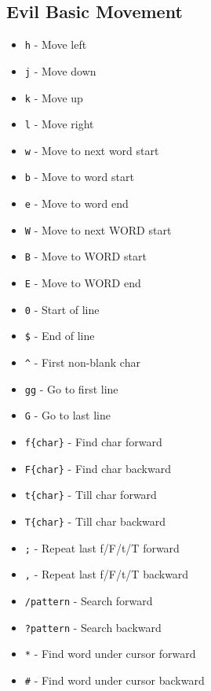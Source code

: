\documentclass[6pt,landscape]{article}
\newcommand{\key}[1]{\texttt{#1}}
\begin{document}
\begin{multicols*}{5}

\section*{Evil Basic Movement}
\begin{itemize}[
    leftmargin=*,
    itemsep=0.1em,
    parsep=0pt,
    topsep=0pt,
    partopsep=0pt,
    align=left,      %
    labelwidth=1em,  %
    labelsep=0.5em,  %
    itemindent=0em,  %
    listparindent=0em, %
    rightmargin=0pt, %
    wide=0pt         %
]
\item \key{h} - Move left
\item \key{j} - Move down
\item \key{k} - Move up
\item \key{l} - Move right
\item \key{w} - Move to next word start
\item \key{b} - Move to word start
\item \key{e} - Move to word end
\item \key{W} - Move to next WORD start
\item \key{B} - Move to WORD start
\item \key{E} - Move to WORD end
\item \key{0} - Start of line
\item \key{\$} - End of line
\item \key{\textasciicircum} - First non-blank char
\item \key{gg} - Go to first line
\item \key{G} - Go to last line
\item \key{f\{char\}} - Find char forward
\item \key{F\{char\}} - Find char backward
\item \key{t\{char\}} - Till char forward
\item \key{T\{char\}} - Till char backward
\item \key{;} - Repeat last f/F/t/T forward
\item \key{,} - Repeat last f/F/t/T backward
\item \key{/pattern} - Search forward
\item \key{?pattern} - Search backward
\item \key{*} - Find word under cursor forward
\item \key{\#} - Find word under cursor backward

\end{itemize}
\end{multicols*}
\end{document}

